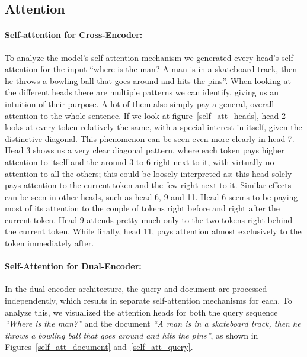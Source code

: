 \documentclass[runningheads]{llncs}
\begin{document}
\subsection{Attention}


\paragraph{Self-attention for Cross-Encoder:} To analyze the model's self-attention mechanism we generated every head's self-attention for the input ``where is the man? A man is in a skateboard track, then he throws a bowling ball that goes around and hits the pins''. When looking at the different heads there are multiple patterns we can identify, giving us an intuition of their purpose. A lot of them also simply pay a general, overall attention to the whole sentence. If we look at figure~\ref{self_att_heads}, head 2 looks at every token relatively the same, with a special interest in itself, given the distinctive diagonal. This phenomenon can be seen even more clearly in head 7. Head 3 shows us a very clear diagonal pattern, where each token pays higher attention to itself and the around 3 to 6 right next to it, with virtually no attention to all the others; this could be loosely interpreted as: this head solely pays attention to the current token and the few right next to it. Similar effects can be seen in other heads, such as head 6, 9 and 11. Head 6 seems to be paying most of its attention to the couple of tokens right before and right after the current token. Head 9 attends pretty much only to the two tokens right behind the current token. While finally, head 11, pays attention almost exclusively to the token immediately after.

\vspace{2\baselineskip plus 0.5\baselineskip minus 0.5\baselineskip} %

\paragraph{Self-Attention for Dual-Encoder:} 
In the dual-encoder architecture, the query and document are processed independently, which results in separate self-attention mechanisms for each. To analyze this, we visualized the attention heads for both the query sequence \textit{``Where is the man?''} and the document \textit{``A man is in a skateboard track, then he throws a bowling ball that goes around and hits the pins''}, as shown in Figures~\ref{self_att_document} and~\ref{self_att_query}.
\end{document}

